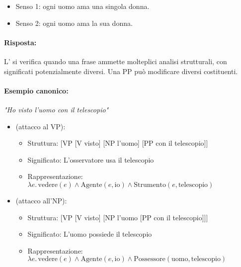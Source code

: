 \begin{itemize}
  \item Senso 1: ogni uomo ama una singola donna. 
  \item Senso 2: ogni uomo ama la sua donna.
\end{itemize}



\paragraph{Risposta:} L' si verifica quando una frase ammette molteplici analisi strutturali, con significati potenzialmente diversi. Una PP può modificare diversi costituenti.

\paragraph{Esempio canonico:}
\textit{"Ho visto l'uomo con il telescopio"}

\begin{itemize}
  \item {} (attacco al VP):
  \begin{itemize}
    \item Struttura: [VP [V visto] [NP l'uomo] [PP con il telescopio]]
    \item Significato: L'osservatore usa il telescopio
    \item Rappresentazione: $\lambda e.\,\text{vedere}(e) \land \text{Agente}(e,\text{io}) \land \text{Strumento}(e,\text{telescopio})$
  \end{itemize}

  \item {} (attacco all'NP):
  \begin{itemize}
    \item Struttura: [VP [V visto] [NP l'uomo [PP con il telescopio]]]
    \item Significato: L'uomo possiede il telescopio
    \item Rappresentazione: $\lambda e.\,\text{vedere}(e) \land \text{Agente}(e,\text{io}) \land \text{Possessore}(\text{uomo},\text{telescopio})$
  \end{itemize}
\end{itemize}

